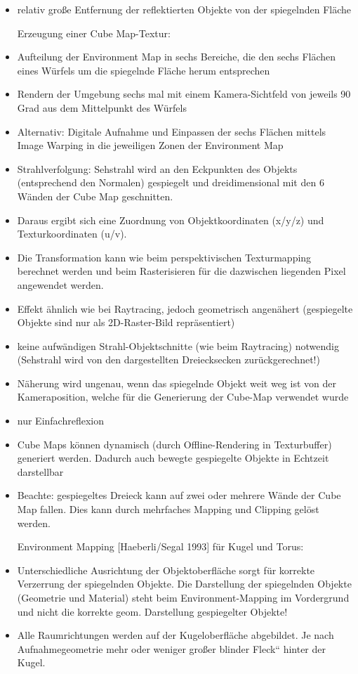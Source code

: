 \documentclass[10pt,landscape]{article}
\begin{document}
\begin{multicols}{3}
{\begin{itemize}
  Grundannahme beim Environment Mapping:
  \item relativ große Entfernung der reflektierten Objekte von der spiegelnden Fläche
  
  Erzeugung einer Cube Map-Textur:
  \item Aufteilung der Environment Map in sechs Bereiche, die den sechs Flächen eines Würfels um die spiegelnde Fläche herum entsprechen
  \item Rendern der Umgebung sechs mal mit einem Kamera-Sichtfeld von jeweils 90 Grad aus dem Mittelpunkt des Würfels
  \item Alternativ: Digitale Aufnahme und Einpassen der sechs Flächen mittels Image Warping in die jeweiligen Zonen der Environment Map
  \item Strahlverfolgung: Sehstrahl wird an den Eckpunkten des Objekts (entsprechend den Normalen) gespiegelt und dreidimensional mit den 6 Wänden der Cube Map geschnitten.
  \item Daraus ergibt sich eine Zuordnung von Objektkoordinaten (x/y/z) und Texturkoordinaten (u/v). 
  \item Die Transformation kann wie beim perspektivischen Texturmapping berechnet werden und beim Rasterisieren für die dazwischen liegenden Pixel angewendet werden.
  \item Effekt ähnlich wie bei Raytracing, jedoch geometrisch angenähert (gespiegelte Objekte sind nur als 2D-Raster-Bild repräsentiert)
  \item keine aufwändigen Strahl-Objektschnitte (wie beim Raytracing) notwendig (Sehstrahl wird von den dargestellten Dreiecksecken zurückgerechnet!)
  \item Näherung wird ungenau, wenn das spiegelnde Objekt weit weg ist von der Kameraposition, welche für die Generierung der Cube-Map verwendet wurde
  \item nur Einfachreflexion
  \item Cube Maps können dynamisch (durch Offline-Rendering in Texturbuffer) generiert werden. Dadurch auch bewegte gespiegelte Objekte in Echtzeit darstellbar
  \item Beachte: gespiegeltes Dreieck kann auf zwei oder mehrere Wände der Cube Map fallen. Dies kann durch mehrfaches Mapping und Clipping gelöst werden.
  
  Environment Mapping [Haeberli/Segal 1993] für Kugel und Torus: 
  \item Unterschiedliche Ausrichtung der Objektoberfläche sorgt für korrekte Verzerrung der spiegelnden Objekte. Die Darstellung der spiegelnden Objekte (Geometrie und Material) steht beim Environment-Mapping im Vordergrund und nicht die korrekte geom. Darstellung gespiegelter Objekte!
  \item Alle Raumrichtungen werden auf der Kugeloberfläche abgebildet. Je nach Aufnahmegeometrie mehr oder weniger großer blinder Fleck“ hinter der Kugel.
  

\end{itemize}}
\end{multicols}
\end{document}

